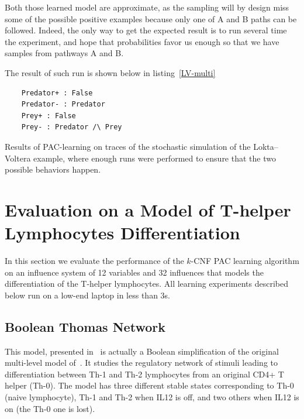 \documentclass{llncs}
\begin{document}
Both those learned model are approximate, as the sampling will by design miss some of the possible positive examples because only one of A and B paths can be followed.
Indeed, the only way to get the expected result is to run several time the experiment, and hope that probabilities favor us enough so that we have samples from pathways A and B.

The result of such run is shown below in listing~\ref{LV-multi}
\begin{listfig}
	\begin{verbatim}
	Predator+ : False
	Predator- : Predator
	Prey+ : False
	Prey- : Predator /\ Prey
	\end{verbatim}
	\vspace{-1em}
	\caption{Results of PAC-learning on traces of the stochastic simulation of the
		Lokta--Voltera example, where enough runs were performed to ensure that the two possible behaviors happen.\label{LV-multi}}
\end{listfig}


\section{Evaluation on a Model of T-helper Lymphocytes Differentiation}\label{ex:lympho}


In this section we evaluate the performance of the $k$-CNF PAC learning
algorithm on an influence system of 12 variables and 32 influences that models
the differentiation of the T-helper lymphocytes.
All learning experiments described below run on a
low-end laptop in less than 3s.

\subsection{Boolean Thomas Network}

This model, presented in~\cite{RRMTC06tcsb} is actually a Boolean
simplification of the original multi-level model
of~\cite{Mendoza06biosystems}. It studies the regulatory network of stimuli
leading to differentiation between Th-1 and Th-2 lymphocytes from an original
CD4+ T helper (Th-0).
The model has three different stable states corresponding to Th-0 (naive
lymphocyte), Th-1 and Th-2 when IL12 is off, and two others when IL12 is on
(the Th-0 one is lost).
\end{document}
